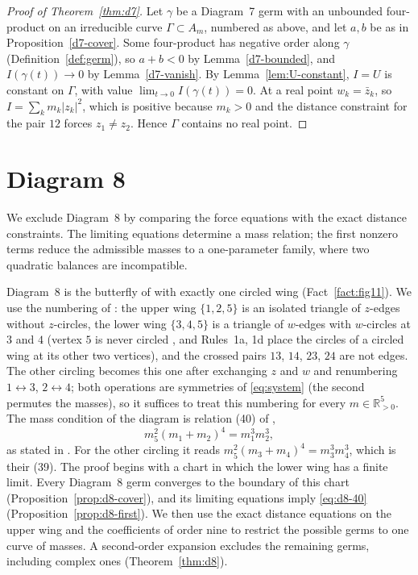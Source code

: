 \documentclass[Threeside,11pt]{article}
\theoremstyle{definition}
\theoremstyle{remark}
\numberwithin{equation}{section}
\theoremstyle{remark}
\newcommand{\Rp}{\mathbb{R}_{>0}}
\begin{document}
\begin{proof}[Proof of Theorem~\ref{thm:d7}]
Let $\gamma$ be a Diagram~7 germ with an unbounded four-product on an irreducible curve
$\Gamma\subset A_m$, numbered as above, and let $a,b$ be as in Proposition~\ref{d7-cover}.  Some
four-product has negative order along $\gamma$ (Definition~\ref{def:germ}), so $a+b<0$ by
Lemma~\ref{d7-bounded}, and $I(\gamma(t))\to0$ by Lemma~\ref{d7-vanish}.  By
Lemma~\ref{lem:U-constant}, $I=U$ is constant on $\Gamma$, with value
$\lim_{t\to0}I(\gamma(t))=0$.  At a real point $w_k=\bar z_k$, so $I=\sum_km_k|z_k|^2$,
which is positive because $m_k>0$ and the distance constraint for the pair $12$ forces $z_1\ne z_2$.  Hence
$\Gamma$ contains no real point.
\end{proof}





\section{Diagram 8}\label{sec:d8}

We exclude Diagram~8 by comparing the force equations with the exact distance
constraints.  The limiting equations determine a mass relation; the first
nonzero terms reduce the admissible masses to a one-parameter family, where
two quadratic balances are incompatible.

Diagram~8 is the butterfly of \cite[\S7.4]{AK} with exactly one circled wing
(Fact~\ref{fact:fig11}).  We use the numbering of \cite[\S8.8]{AK}: the upper wing $\{1,2,5\}$
is an isolated triangle of $z$-edges without $z$-circles, the lower wing $\{3,4,5\}$ is a
triangle of $w$-edges with $w$-circles at $3$ and $4$ (vertex $5$ is never circled
\cite[\S7.4]{AK}, and Rules~1a, 1d place the circles of a circled wing at its other two
vertices), and the crossed pairs $13$, $14$, $23$, $24$ are not edges.
The other circling becomes this one after exchanging $z$ and $w$ and renumbering
$1\leftrightarrow3$, $2\leftrightarrow4$; both operations are symmetries of \eqref{eq:system}
(the second permutes the masses), so it suffices to treat this numbering for every
$m\in\Rp^5$.
The mass condition of the diagram is relation (40) of \cite[\S8.8]{AK},
\begin{equation}\label{eq:d8-40}
  m_5^2(m_1+m_2)^4=m_1^3m_2^3,
\end{equation}
as stated in \cite[p.~578]{AK}.  For the other circling it reads $m_5^2(m_3+m_4)^4=m_3^3m_4^3$, which is their (39).
The proof begins with a chart in which the lower wing has a finite limit.
Every Diagram~8 germ converges to the boundary of this chart
(Proposition~\ref{prop:d8-cover}), and its limiting equations imply
\eqref{eq:d8-40} (Proposition~\ref{prop:d8-first}).  We then use the
{exact distance equations on the upper wing and the coefficients of order nine
to restrict the possible germs to one curve of}
masses.  A second-order expansion excludes the remaining germs, including complex
ones (Theorem~\ref{thm:d8}).
\end{document}
